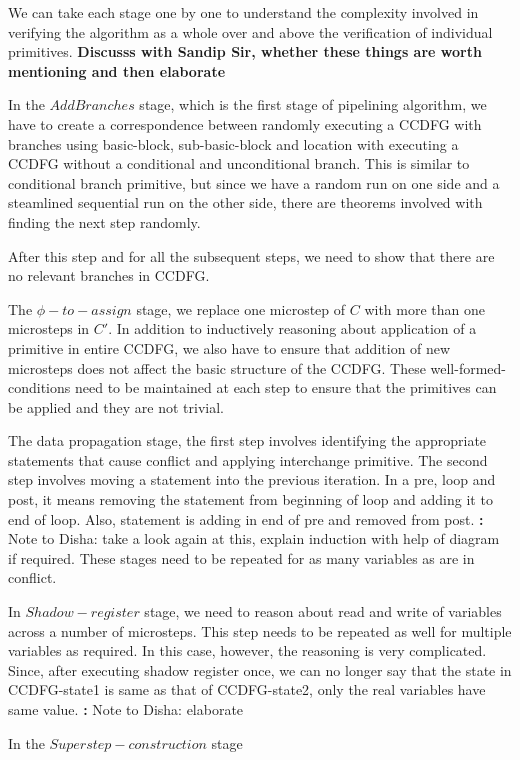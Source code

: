 We can take each stage one by one to understand the complexity involved in 
verifying the algorithm as a whole over and above the verification of 
individual primitives. \textbf{Discusss with Sandip Sir, whether these things are worth mentioning and then elaborate}

In the $AddBranches$ stage, which is the first stage of pipelining algorithm, we 
have to create a correspondence between randomly executing a CCDFG with branches 
using basic-block, sub-basic-block and location with executing a CCDFG without 
a conditional and unconditional branch. This is similar to conditional branch primitive, but since 
we have a random run on one side and a steamlined sequential run on the other side, 
there are theorems involved with finding the next step randomly. 

After this step and for all the subsequent steps, we need to show that there are no relevant branches in CCDFG.

The $\phi-to-assign$ stage, we replace one microstep of $C$ with more than one microsteps in $C'$. 
In addition to inductively reasoning about application of a primitive in entire CCDFG, we also have to ensure
that addition of new microsteps does not affect the basic structure of the CCDFG. These well-formed-conditions
need to be maintained at each step to ensure that the primitives can be applied and they are not trivial.

The data propagation stage, the first step involves identifying the appropriate statements that cause conflict 
and applying interchange primitive. The second step involves moving a statement into the previous iteration. 
In a pre, loop and post, it means removing the statement from beginning of loop and adding it to end of loop. 
Also, statement is adding in end of pre and removed 
from post. {\textbf: Note to Disha: take a look again at this, explain induction with help of diagram if required}.  
These stages need to be
repeated for as many variables as are in conflict. 

In $Shadow-register$ stage, we need to reason about read and write of variables across a number of microsteps. 
This step needs to be repeated as well for multiple variables as required. In this case, however, the reasoning is 
very complicated. Since, after executing shadow register once, we can no longer say that the state in CCDFG-state1 
is same as that of CCDFG-state2, only the real variables have same value. {\textbf: Note to Disha:  elaborate}

In the $Superstep-construction$ stage

